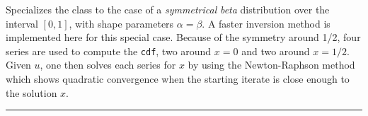 
Specializes the class  to the case of a \emph{symmetrical}
{\em beta\/} distribution over the interval $[0,1]$,
with shape parameters $\alpha = \beta$.
A faster inversion method is implemented here for this special case.
Because of the symmetry around 1/2, four series are used to compute the
\texttt{cdf}, two around $x = 0$ and two around $x = 1/2$.
Given $u$, one then solves each series for $x$ by using the
 Newton-Raphson method which shows quadratic convergence when the
starting iterate is close enough to the solution $x$.

\bigskip\hrule

